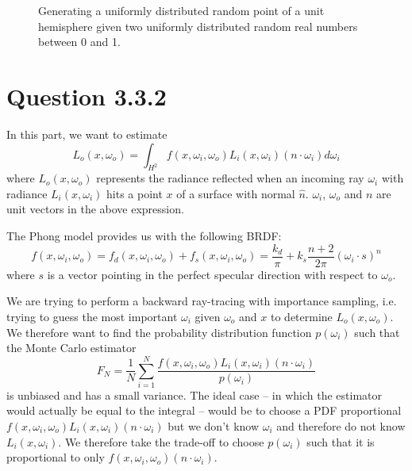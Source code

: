 \documentclass{article}
\begin{document}
\begin{figure}[h]
\centering
{}
\caption{Generating a uniformly distributed random point of a unit hemisphere given two uniformly distributed random real numbers between 0 and 1.}
\label{fig:hemisphere}
\end{figure}

\section*{Question 3.3.2}
In this part, we want to estimate
$$
L_o(x, \omega_o) = \int_{H^2}f(x, \omega_i, \omega_o)L_i(x, \omega_i)(n \cdot \omega_i)d\omega_i
$$
where $L_o(x, \omega_o)$ represents the radiance reflected when an incoming ray $\omega_i$ with radiance $L_i(x, \omega_i)$ hits a point $x$ of a surface with normal $\hat n$. $\omega_i$, $\omega_o$ and $n$ are unit vectors in the above expression.

The Phong model provides us with the following BRDF:
$$
f(x, \omega_i, \omega_o) = f_d(x, \omega_i, \omega_o) + f_s(x, \omega_i, \omega_o) = \frac{k_d}{\pi} + k_s\frac{n + 2}{2\pi}(\omega_i \cdot s)^n
$$
where $s$ is a vector pointing in the perfect specular direction with respect to $\omega_o$.

We are trying to perform a backward ray-tracing with importance sampling, i.e. trying to guess the most important $\omega_i$ given $\omega_o$ and $x$ to determine $L_o(x, \omega_o)$. We therefore want to find the probability distribution function $p(\omega_i)$ such that the Monte Carlo estimator
$$F_N = \frac{1}{N}\sum\limits_{i=1}^N\frac{f(x, \omega_i, \omega_o)L_i(x, \omega_i)(n \cdot \omega_i)}{p(\omega_i)}
$$
is unbiased and has a small variance. The ideal case -- in which the estimator would actually be equal to the integral -- would be to choose a PDF proportional $f(x, \omega_i, \omega_o)L_i(x, \omega_i)(n \cdot \omega_i)$ but we don't know $\omega_i$ and therefore do not know $L_i(x, \omega_i)$. We therefore take the trade-off to choose $p(\omega_i)$ such that it is proportional to only $f(x, \omega_i, \omega_o)(n \cdot \omega_i)$.
\end{document}
